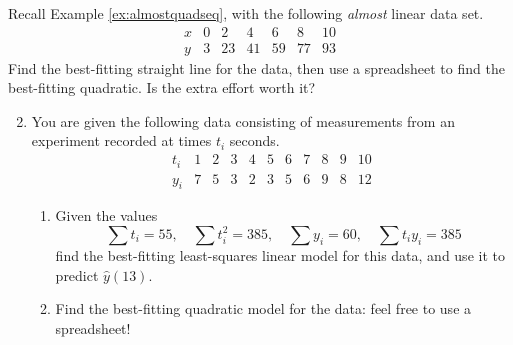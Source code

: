 \begin{exercises}{}{}
	\exstart Recall Example \ref{ex:almostquadseq}, with the following \emph{almost} linear data set.
	\[
		\begin{array}{c|cccccc}
			x&0&2&4&6&8&10\\\hline
			y&3&23&41&59&77&93
		\end{array}
	\]
	Find the best-fitting straight line for the data, then use a spreadsheet to find the best-fitting quadratic. Is the extra effort worth it? 
	
	\begin{enumerate}\setcounter{enumi}{1}
	  \item You are given the following data consisting of measurements from an experiment recorded at times $t_i$ seconds.
	  \[
	  	\begin{array}{c|cccccccccc}
	  		t_i&1&2&3&4&5&6&7&8&9&10\\\hline
	  		y_i&7&5&3&2&3&5&6&9&8&12
	  	\end{array}
	  \]
	  \begin{enumerate}
	    \item Given the values
	  	\[
	  		\sum t_i=55,\quad \sum t_i^2=385,\quad \sum y_i=60,\quad \sum t_iy_i=385
	  	\]
	  	find the best-fitting least-squares linear model for this data, and use it to predict $\hat y(13)$.
	    
	    \item Find the best-fitting quadratic model for the data: feel free to use a spreadsheet!
	    

\end{enumerate}
\end{enumerate}
\end{exercises}
